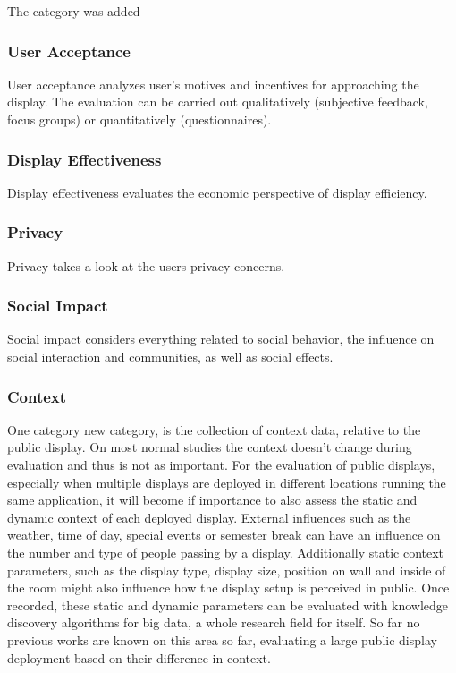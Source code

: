 	The category was added 

	\subsubsection{User Acceptance}

		User acceptance analyzes user's motives and incentives for approaching the display. The evaluation can be carried out qualitatively (subjective feedback, focus groups) or quantitatively (questionnaires).

	\subsubsection{Display Effectiveness}
		Display effectiveness evaluates the economic perspective of display efficiency. 

	\subsubsection{Privacy}
		Privacy takes a look at the users privacy concerns.

	\subsubsection{Social Impact}
		Social impact considers everything related to social behavior, the influence on social interaction and communities, as well as social effects.

	\subsubsection{Context}

		One category new category, is the collection of context data, relative to the public display. On most normal studies the context doesn't change during evaluation and thus is not as important. For the evaluation of public displays, especially when multiple displays are deployed in different locations running the same application, it will become if importance to also assess the static and dynamic context of each deployed display. External influences such as the weather, time of day, special events or semester break can have an influence on the number and type of people passing by a display. Additionally static context parameters, such as the display type, display size, position on wall and inside of the room might also influence how the display setup is perceived in public. Once recorded, these static and dynamic parameters can be evaluated with knowledge discovery algorithms for big data, a whole research field for itself. 
		So far no previous works are known on this area so far, evaluating a large public display deployment based on their difference in context.

